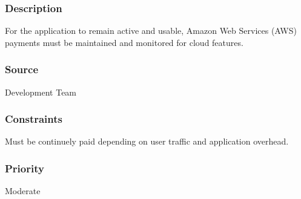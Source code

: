 \subsubsection{Description}
For the application to remain active and usable, Amazon Web Services (AWS) payments must be maintained and monitored for cloud features.
\subsubsection{Source}
Development Team
\subsubsection{Constraints}
Must be continuely paid depending on user traffic and application overhead.
\subsubsection{Priority}
Moderate
